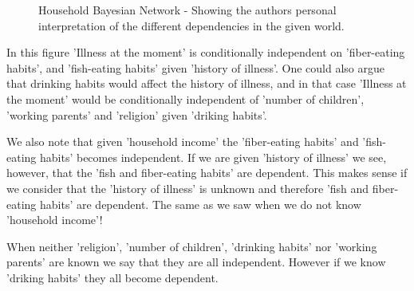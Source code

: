 \documentclass{article}
\begin{document}
\begin{figure}[h]
\centering
{}
\caption{Household Bayesian Network - Showing the authors personal interpretation of the different dependencies in the given world. }
\end{figure}

\newpage

In this figure 'Illness at the moment' is conditionally independent on 'fiber-eating habits', 
and 'fish-eating habits' given 'history of illness'. One could also argue that drinking
habits would affect the history of illness, and in that case 'Illness at the moment' would be conditionally
independent of 'number of children', 'working parents' and 'religion' given 'driking habits'. 

We also note that given 'household income' the 'fiber-eating habits' and 'fish-eating habits' becomes
independent. If we are given 'history of illness' we see, however, that the 'fish and fiber-eating habits' are dependent. This makes sense if we consider that the 'history of illness' is unknown and therefore 
'fish and fiber-eating habits' are dependent. The same as we saw when we do not know 'household income'!

When neither 'religion', 'number of children', 'drinking habits' nor 'working parents' are known we say
that they are all independent. However if we know 'driking habits' they all become dependent.
\end{document}
